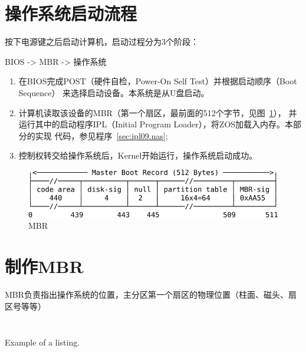 \documentclass{swfcthesis}
\begin{document}
\section{操作系统启动流程}

按下电源键之后启动计算机，启动过程分为3个阶段\cite{hbt}：
\begin{center}BIOS -> MBR -> 操作系统\end{center}

\begin{enumerate}
\item 在BIOS完成POST（硬件自检，Power-On Self Test）并根据启动顺序（Boot Sequence）
  来选择启动设备。本系统是从U盘启动。
\item 计算机读取该设备的MBR（第一个扇区，最前面的512个字节，见图~\ref{fig:mbr}），
  并运行其中的启动程序IPL（Initial Program Loader），将ZOS加载入内存。本部分的实现
  代码，参见程序~\ref{sec:ipl09.nas};
\item 控制权转交给操作系统后，Kernel开始运行，操作系统启动成功。
\end{enumerate}

\begin{figure}
  \centering
  \includegraphics[width=1\textwidth]{fig/mbr.pdf}
  \caption{MBR}
  \label{fig:mbr}
\end{figure}

\section{制作MBR}

MBR负责指出操作系统的位置，主分区第一个扇区的物理位置（柱面、磁头、扇区号等等）

\begin{listing}[H]
  \inputminted[tabsize=2, firstline=6, lastline=6,
  linenos=true]{nasm}{../ZOS/src/kernel/ipl09.nas}
  \inputminted[tabsize=2, firstline=12, lastline=29,
  linenos=true]{nasm}{../ZOS/src/kernel/ipl09.nas}
  \caption{Example of a listing.}
  \label{lst:example}
\end{listing}

\inputminted[tabsize=2, firstline=43, lastline=45,
linenos=true]{nasm}{../ZOS/src/kernel/ipl09.nas}

\inputminted[tabsize=2, firstline=76, lastline=88,
linenos=true]{nasm}{../ZOS/src/kernel/ipl09.nas}
\end{document}
